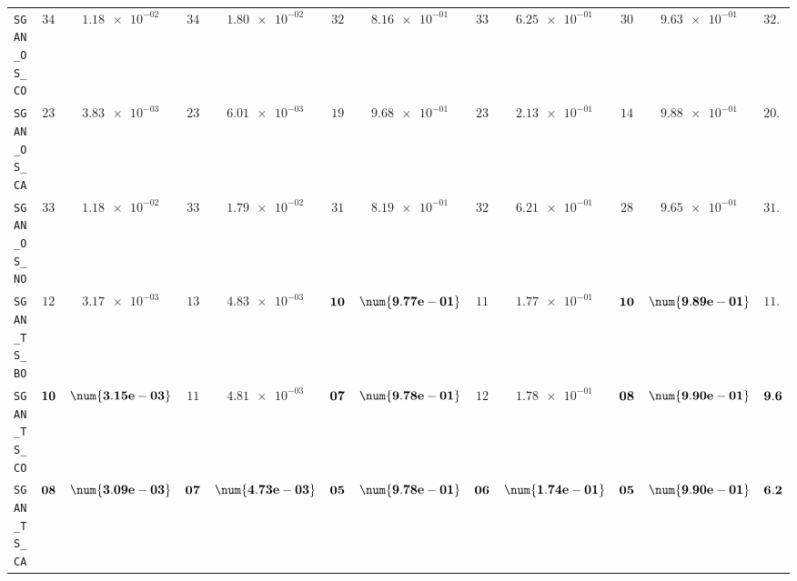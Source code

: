 \begin{table}[H]
\begin{tabularx}{\textwidth}{l||cC|cC|cC|cC|cC||c}
		\texttt{SGAN\_OS\_CO} & $ 34$ & $ \num{1.18e-02}$ & $ 34$ & $ \num{1.80e-02}$ & $ 32$ & $ \num{8.16e-01}$ & $ 33$ & $ \num{6.25e-01}$ & $ 30$ & $ \num{9.63e-01}$ & $ 32.6$  \\
		\texttt{SGAN\_OS\_CA} & $ 23$ & $ \num{3.83e-03}$ & $ 23$ & $ \num{6.01e-03}$ & $ 19$ & $ \num{9.68e-01}$ & $ 23$ & $ \num{2.13e-01}$ & $ 14$ & $ \num{9.88e-01}$ & $ 20.4$  \\
		\texttt{SGAN\_OS\_NO} & $ 33$ & $ \num{1.18e-02}$ & $ 33$ & $ \num{1.79e-02}$ & $ 31$ & $ \num{8.19e-01}$ & $ 32$ & $ \num{6.21e-01}$ & $ 28$ & $ \num{9.65e-01}$ & $ 31.4$  \\
		\texttt{SGAN\_TS\_BO} & $ 12$ & $ \num{3.17e-03}$ & $ 13$ & $ \num{4.83e-03}$ & $\bf 10$ & $\bf \num{9.77e-01}$ & $ 11$ & $ \num{1.77e-01}$ & $\bf 10$ & $\bf \num{9.89e-01}$ & $ 11.2$  \\
		\texttt{SGAN\_TS\_CO} & $\bf 10$ & $\bf \num{3.15e-03}$ & $ 11$ & $ \num{4.81e-03}$ & $\bf 07$ & $\bf \num{9.78e-01}$ & $ 12$ & $ \num{1.78e-01}$ & $\bf 08$ & $\bf \num{9.90e-01}$ & $\bf 9.6$  \\
		\texttt{SGAN\_TS\_CA} & $\bf 08$ & $\bf \num{3.09e-03}$ & $\bf 07$ & $\bf \num{4.73e-03}$ & $\bf 05$ & $\bf \num{9.78e-01}$ & $\bf 06$ & $\bf \num{1.74e-01}$ & $\bf 05$ & $\bf \num{9.90e-01}$ & $\bf 6.2$  \\

\end{tabularx}
\end{table}
